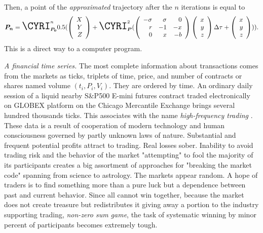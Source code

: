 \documentclass{article}
\begin{document}
Then, a point of the \textit{approximated} trajectory after the $n$ iterations is equal to
\begin{displaymath}
\boldsymbol{P_n} = \textrm{\LARGE{\CYRI}}_{\boldsymbol{P_0}}^{n}0.5
(
\left(
\begin{array}{r}
X\\
Y\\
Z
\end{array}
\right) + \textrm{\LARGE{\CYRI}}_{\boldsymbol{P}}^{2}(
\left(
\begin{array}{rrr}
-\sigma&\sigma&0\\
r&-1&-x\\
0&x&-b
\end{array}
\right)
\left(
\begin{array}{r}
x\\
y\\
z
\end{array}
\right)\Delta\tau +
\left(
\begin{array}{r}
x\\
y\\
z
\end{array}
\right)
)).
\end{displaymath}
This is a direct way to a computer program.

\textit{A financial time series.} The most complete information about transactions comes from the markets as ticks, triplets of time, price, and number of contracts or shares named volume $(t_i, P_i, V_i)$. They are ordered by time. An ordinary daily session of a liquid nearby S\&P500 E-mini futures contract traded electronically on GLOBEX platform on the Chicago Mercantile Exchange brings several hundred thousands ticks. This associates with the name \textit{high-frequency trading} \cite{engle}. These data is a result of cooperation of modern technology and human consciousness governed by partly unknown laws of nature. Substantial and frequent potential profits attract to trading. Real losses sober. Inability to avoid trading risk and the behavior of the market "attempting" to fool the majority of its participants creates a big assortment of approaches for "breaking the market code" spanning from science to astrology. The markets appear random. A hope of traders is to find something more than a pure luck but a dependence between past and current behavior. Since all cannot win together, because the market does not create treasure but redistributes it giving away a portion to the industry supporting trading, \textit{non-zero sum game}, the task of systematic winning by minor percent of participants becomes extremely tough.
\end{document}
